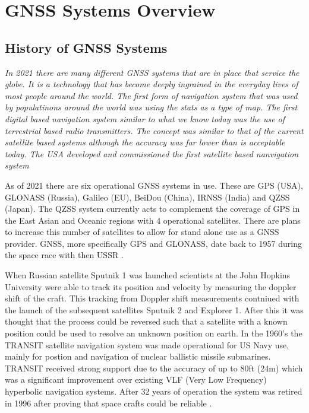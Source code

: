 
\chapter{GNSS Systems Overview} %

\label{Chapter2} %


\section{History of GNSS Systems}
\emph{In 2021 there are many different GNSS systems that are in place that service the globe. It is a technology that has become deeply ingrained in the everyday lives of
most people around the world. The first form of navigation system that was used by populatinons around the world was using the stats as a type of map. The first digital
based navigation system similar to what we know today was the use of terrestrial based radio transmitters. The concept was similar to that of the current satellite based
systems although the accuracy was far lower than is acceptable today. The USA developed and commissioned the first satellite based nanvigation system}

As of 2021 there are six operational GNSS systems in use. These are GPS (USA), GLONASS (Russia), Galileo (EU), BeiDou (China), IRNSS (India) and QZSS (Japan). The QZSS
system currently acts to complement the coverage of GPS in the East Asian and Oceanic regions with 4 operational satellites. There are plans to increase this number of
satellites to allow for stand alone use as a GNSS provider. 
GNSS, more specifically GPS and GLONASS, date back to 1957 during the space race with then USSR \cite{RN43}. 

When Russian satellite Sputnik 1 was launched scientists at the John Hopkins University were able to track its position and velocity by measuring the doppler shift of the
craft. This tracking from Doppler shift measurements contniued with the launch of the subsequent satellites Sputnik 2 and Explorer 1. After this it was thought that the
process could be reversed such that a satellite with a known position could be used to resolve an unknown position on earth. In the 1960's the TRANSIT satellite
navigation system was made operational for US Navy use, mainly for postion and navigation of nuclear ballistic missile submarines. TRANSIT received strong support due to
the accuracy of up to 80ft (24m) which was a significant improvement over existing VLF (Very Low Frequency) hyperbolic navigation systems. After 32 years of operation the
system was retired in 1996 after proving that space crafts could be reliable \cite{RN45}. 

